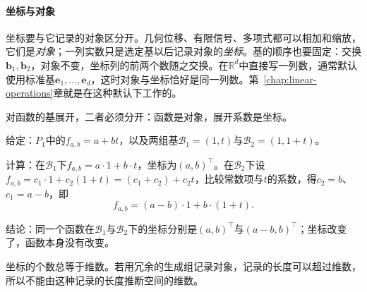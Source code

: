 \paragraph{坐标与对象}
坐标要与它记录的对象区分开。几何位移、有限信号、多项式都可以相加和缩放，它们是\emph{对象}；一列实数只是选定基以后记录对象的\emph{坐标}。基的顺序也要固定：交换$\bm b_1,\bm b_2$，对象不变，坐标列的前两个数随之交换。在$\mathbb R^d$中直接写一列数，通常默认使用标准基$\bm e_1,\ldots,\bm e_d$，这时对象与坐标恰好是同一列数。第~\ref{chap:linear-operations}章就是在这种默认下工作的。

对函数的基展开，二者必须分开：函数是对象，展开系数是坐标。
\begin{example}[仿射函数在两组基下的坐标]
\label{ex:ls-affine-function-coordinates}
给定：$P_1$中的$f_{a,b}=a+bt$，以及两组基$\mathcal B_1=(1,t)$与$\mathcal B_2=(1,1+t)$。

计算：在$\mathcal B_1$下$f_{a,b}=a\cdot1+b\cdot t$，坐标为$(a,b)^\top$。在$\mathcal B_2$下设$f_{a,b}=c_1\cdot1+c_2(1+t)=(c_1+c_2)+c_2t$，比较常数项与$t$的系数，得$c_2=b$、$c_1=a-b$，即
\[
 f_{a,b}=(a-b)\cdot1+b\cdot(1+t).
\]

结论：同一个函数在$\mathcal B_1$与$\mathcal B_2$下的坐标分别是$(a,b)^\top$与$(a-b,b)^\top$；坐标改变了，函数本身没有改变。
\end{example}
坐标的个数总等于维数。若用冗余的生成组记录对象，记录的长度可以超过维数，所以不能由这种记录的长度推断空间的维数。

